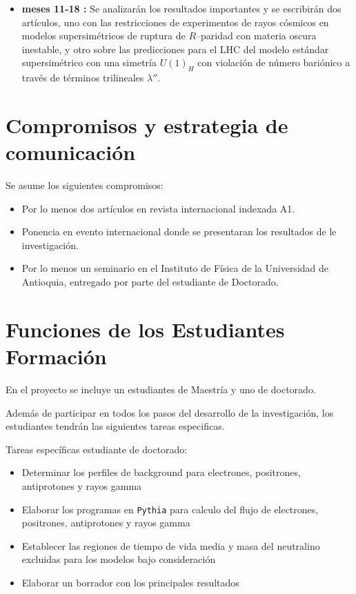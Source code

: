 \documentclass[11pt]{article}
\begin{document}
\begin{itemize}
\item {\bf meses 11-18 : } Se analizarán los resultados importantes y se escribirán dos artículos, uno con las restricciones de experimentos de rayos cósmicos en modelos supersimétricos de ruptura de $R$--paridad con materia oscura inestable, y otro sobre las predicciones para el LHC del modelo estándar supersimétrico con una simetría $U(1)_H$ con violación de número bariónico a través de términos trilineales $\lambda''$.

\end{itemize}



\section{ Compromisos y estrategia de comunicación }


Se asume los siguientes compromisos:

\begin{itemize}

\item Por lo menos dos artículos en revista internacional indexada
  A1.

\item Ponencia en evento internacional donde se presentaran los resultados de le
  investigación.

\item
Por lo menos un seminario en el Instituto de Física de la Universidad
de Antioquia, entregado por parte del estudiante de Doctorado.

\end{itemize}






\section{ Funciones de los Estudiantes Formación }



En el proyecto se incluye un estudiantes de Maestría y uno de doctorado.

Además de participar en todos los pasos del desarrollo de la
investigación, los estudiantes  tendrán las siguientes
tareas especificas.

Tareas específicas  estudiante de doctorado:
\begin{itemize}
\item Determinar los perfiles de background para electrones, positrones, antiprotones y rayos gamma
\item Elaborar los programas en \texttt{Pythia} para calculo del flujo de electrones, positrones, antiprotones y rayos gamma
\item Establecer las regiones de tiempo de vida media y masa del neutralino excluidas para los modelos bajo consideración
\item Elaborar un borrador con los principales resultados
\end{itemize}
\end{document}
